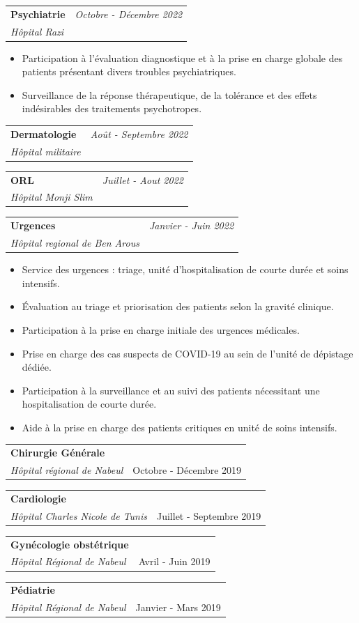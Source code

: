 \documentclass[a4paper,11pt]{article}
\makeatletter
\newcommand{\resumeSubheading}[4]{
\vspace{0.5mm}\item
    \begin{tabular*}{0.98\textwidth}[t]{l@{\extracolsep{\fill}}r}
        \textbf{#1} & \textit{\footnotesize{#4}} \\
        \textit{\footnotesize{#3}} &  \footnotesize{#2}\\
    \end{tabular*}
    \vspace{-2.4mm}
}
\newcommand{\resumeItemListStart}{\begin{itemize}[leftmargin=*,labelsep=1mm,itemsep=0.5mm]}
\newcommand{\resumeItemListEnd}{\end{itemize}\vspace{-2mm}}
\makeatother
\begin{document}
    \resumeSubheading
      {{Psychiatrie }}{}
      {Hôpital Razi}{Octobre - Décembre 2022}
      \resumeItemListStart
        \item Participation à l’évaluation diagnostique et à la prise en charge globale des patients \newline présentant divers troubles psychiatriques.
        \item Surveillance de la réponse thérapeutique, de la tolérance et des effets indésirables \newline des traitements psychotropes.
    \resumeItemListEnd
    \vspace{-1mm}
    \resumeSubheading
      {{Dermatologie}}{}
      {Hôpital militaire}{Août - Septembre 2022}
    \resumeSubheading
      {{ORL}}{}
     {Hôpital Monji Slim}{Juillet - Aout 2022}
    \resumeSubheading
      {{Urgences }}{}
      {Hôpital regional de Ben Arous}{Janvier - Juin 2022}
      \resumeItemListStart
        \item Service des urgences : triage, unité d’hospitalisation de courte durée et soins intensifs.
        \item Évaluation au triage et priorisation des patients selon la gravité clinique.
        \item Participation à la prise en charge initiale des urgences médicales.
        \item Prise en charge des cas suspects de COVID-19 au sein de l’unité de dépistage dédiée.
        \item Participation à la surveillance et au suivi des patients nécessitant une hospitalisation \newline de courte durée.
        \item Aide à la prise en charge des patients critiques en unité de soins intensifs.
    \resumeItemListEnd
    \vspace{4mm}
    \vspace{2mm}

    \resumeSubheading
      {{Chirurgie Générale}}{Octobre - Décembre 2019}
      {Hôpital régional de Nabeul}{}

    \resumeSubheading
      {{Cardiologie}}{Juillet - Septembre 2019}
      {Hôpital Charles Nicole de Tunis}{}

    \resumeSubheading
      {{Gynécologie obstétrique}}{Avril - Juin 2019}
      {Hôpital Régional de Nabeul}{}

    \resumeSubheading
      {{Pédiatrie }}{Janvier - Mars 2019}
      {Hôpital Régional de Nabeul}{}
\end{document}
